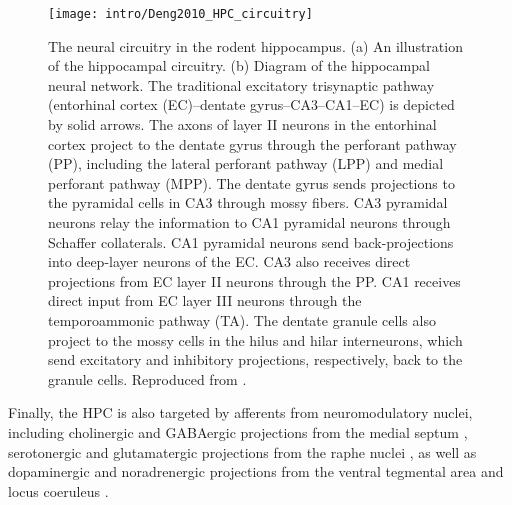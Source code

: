 \begin{figure}
	\centering
	\texttt{[image: intro/Deng2010\_HPC\_circuitry]}
	\caption[The neural circuitry in the rodent hippocampus]{The neural circuitry in the rodent hippocampus.
	(a) An illustration of the hippocampal circuitry.
	(b) Diagram of the hippocampal neural network. The traditional excitatory trisynaptic pathway (entorhinal cortex (EC)--dentate gyrus--CA3--CA1--EC) is depicted by solid arrows. The axons of layer II neurons in the entorhinal cortex project to the dentate gyrus through the perforant pathway (PP), including the lateral perforant pathway (LPP) and medial perforant pathway (MPP). The dentate gyrus sends projections to the pyramidal cells in CA3 through mossy fibers. CA3 pyramidal neurons relay the information to CA1 pyramidal neurons through Schaffer collaterals. CA1 pyramidal neurons send back-projections into deep-layer neurons of the EC. CA3 also receives direct projections from EC layer II neurons through the PP. CA1 receives direct input from EC layer III neurons through the temporoammonic pathway (TA). The dentate granule cells also project to the mossy cells in the hilus and hilar interneurons, which send excitatory and inhibitory projections, respectively, back to the granule cells. 
	Reproduced from \citet{Deng2010}.}
	\label{fig:intro:memory:HPC_circuitry}
\end{figure}

Finally, the \ac{HPC} is also targeted by afferents from neuromodulatory nuclei, including cholinergic and GABAergic projections from the medial septum  \citep{Klausberger2008}, serotonergic and glutamatergic projections from the raphe nuclei \citep{Varga2009}, as well as dopaminergic and noradrenergic projections from the ventral tegmental area \citep{Gasbarri1997} and locus coeruleus \citep{Foote1983}.


